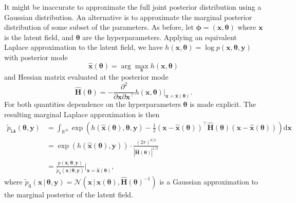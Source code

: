 \documentclass[a4paper, nobind]{templates/ociamthesis}
\begin{document}
It might be inaccurate to approximate the full joint posterior distribution using a Gaussian distribution.
An alternative is to approximate the marginal posterior distribution of some subset of the parameters.
As before, let \(\boldsymbol{\mathbf{\phi}} = (\mathbf{x}, \boldsymbol{\mathbf{\theta}})\) where \(\mathbf{x}\) is the latent field, and \(\boldsymbol{\mathbf{\theta}}\) are the hyperparameters.
Applying an equivalent Laplace approximation to the latent field, we have \(h(\mathbf{x}, \boldsymbol{\mathbf{\theta}}) = \log p(\mathbf{x}, \boldsymbol{\mathbf{\theta}}, \mathbf{y})\) with posterior mode
\begin{equation}
\hat{\mathbf{x}}(\boldsymbol{\mathbf{\theta}}) = \arg\max_{\mathbf{x}} h(\mathbf{x}, \boldsymbol{\mathbf{\theta}})
\end{equation}
and Hessian matrix evaluated at the posterior mode
\begin{equation}
\hat {\mathbf{H}}(\boldsymbol{\mathbf{\theta}}) = - \frac{\partial^2}{\partial \mathbf{x} \partial \mathbf{x}^\top} h(\mathbf{x}, \boldsymbol{\mathbf{\theta}}) \rvert_{\mathbf{x} = \hat{\mathbf{x}}(\boldsymbol{\mathbf{\theta}})}.
\end{equation}
For both quantities dependence on the hyperparameters \(\boldsymbol{\mathbf{\theta}}\) is made explicit.
The resulting marginal Laplace approximation is then
\begin{align}
\tilde p_{\texttt{LA}}(\boldsymbol{\mathbf{\theta}}, \mathbf{y}) &= \int_{\mathbb{R}^N} \exp \left( h(\hat{\mathbf{x}}(\boldsymbol{\mathbf{\theta}}), \boldsymbol{\mathbf{\theta}}, \mathbf{y}) - \frac{1}{2} (\mathbf{x} - \hat{\mathbf{x}}(\boldsymbol{\mathbf{\theta}}))^\top \hat {\mathbf{H}}(\boldsymbol{\mathbf{\theta}}) (\mathbf{x} - \hat{\mathbf{x}}(\boldsymbol{\mathbf{\theta}})) \right) \text{d}\mathbf{x} \label{eq:marginalla} \\
&= \exp(h(\hat{\mathbf{x}}(\boldsymbol{\mathbf{\theta}}), \mathbf{y})) \cdot \frac{(2 \pi)^{d/2}}{| \hat {\mathbf{H}}(\boldsymbol{\mathbf{\theta}}) |^{1/2}} \\
&= \frac{p(\mathbf{x}, \boldsymbol{\mathbf{\theta}}, \mathbf{y})}{\tilde p_\texttt{G}(\mathbf{x} \, | \, \boldsymbol{\mathbf{\theta}}, \mathbf{y})} \Big\rvert_{\mathbf{x} = \hat{\mathbf{x}}(\boldsymbol{\mathbf{\theta}})},
\end{align}
where \(\tilde p_\texttt{G}(\mathbf{x} \, | \, \boldsymbol{\mathbf{\theta}}, \mathbf{y}) = \mathcal{N}(\mathbf{x} \, | \, \hat{\mathbf{x}}(\boldsymbol{\mathbf{\theta}}), \hat{\mathbf{H}}(\boldsymbol{\mathbf{\theta}})^{-1})\) is a Gaussian approximation to the marginal posterior of the latent field.
\end{document}
